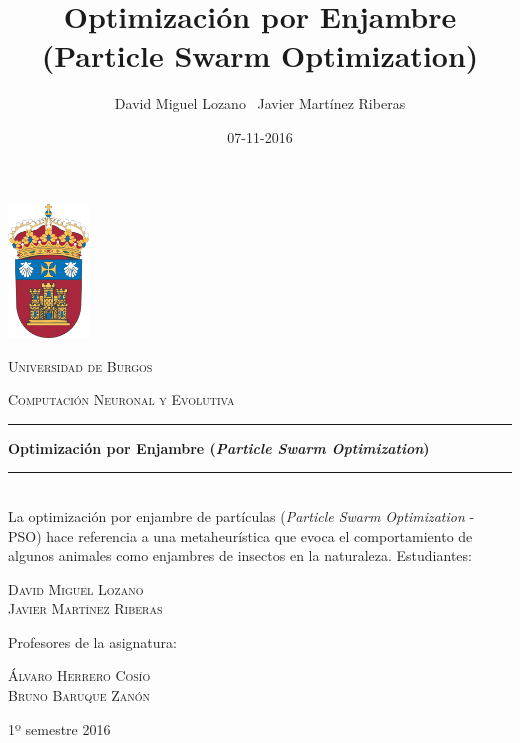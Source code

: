 \documentclass[a4paper,12pt,titlepage]{article}
\newcommand{\HRule}[1]{\rule{\linewidth}{#1}}
\begin{document}
\author{David Miguel Lozano \ Javier Martínez Riberas}
\title{Optimización por Enjambre (Particle Swarm Optimization)}
\date{07-11-2016}

\begin{titlepage}
	\centering
	\includegraphics[width=0.16\textwidth]{ubu-logo.png}\par
	\vspace{0.3cm}
	{\scshape\LARGE Universidad de Burgos \par}
	\vfill
	{\scshape\Large Computación Neuronal y Evolutiva \par}
	\HRule{2pt}
	{\huge\bfseries Optimización por Enjambre (\textit{Particle Swarm Optimization}) \par}
	\HRule{2pt}
	\\ [0.5cm]
	{La optimización por enjambre de partículas (\textit{Particle Swarm Optimization} - PSO) hace referencia a una metaheurística que evoca el comportamiento de algunos animales como enjambres de insectos en la naturaleza.}
	\vfill
	Estudiantes:\par
	{\Large\scshape David Miguel Lozano \\ Javier Martínez Riberas \par}
	\vfill
	Profesores de la asignatura:\par
	\textsc{Álvaro Herrero Cosío \\ Bruno Baruque Zanón}
	\vfill
	{\large 1º semestre 2016 \par}
\end{titlepage}

\newpage
\tableofcontents
\begin{appendix}
\end{appendix}

\newpage
\end{document}
